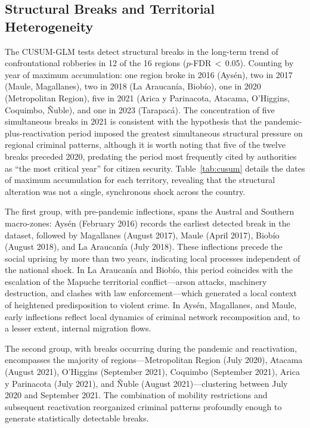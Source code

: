 \documentclass[pdflatex,sn-basic]{sn-jnl}
\begin{document}
\subsection{Structural Breaks and Territorial Heterogeneity}
\label{sub:regional}

The CUSUM-GLM tests detect structural breaks in the long-term trend of confrontational robberies in 12 of the 16 regions ($p$-FDR\,$<$\,0.05). Counting by year of maximum accumulation: one region broke in 2016 (Ays\'en), two in 2017 (Maule, Magallanes), two in 2018 (La Araucan\'ia, Biob\'io), one in 2020 (Metropolitan Region), five in 2021 (Arica y Parinacota, Atacama, O'Higgins, Coquimbo, \~Nuble), and one in 2023 (Tarapac\'a). The concentration of five simultaneous breaks in 2021 is consistent with the hypothesis that the pandemic-plus-reactivation period imposed the greatest simultaneous structural pressure on regional criminal patterns, although it is worth noting that five of the twelve breaks preceded 2020, predating the period most frequently cited by authorities as ``the most critical year'' for citizen security. Table~\ref{tab:cusum} details the dates of maximum accumulation for each territory, revealing that the structural alteration was not a single, synchronous shock across the country. 

The first group, with pre-pandemic inflections, spans the Austral and Southern macro-zones: Ays\'en (February 2016) records the earliest detected break in the dataset, followed by Magallanes (August 2017), Maule (April 2017), Biob\'io (August 2018), and La Araucan\'ia (July 2018). These inflections precede the social uprising by more than two years, indicating local processes independent of the national shock. In La Araucan\'ia and Biob\'io, this period coincides with the escalation of the Mapuche territorial conflict---arson attacks, machinery destruction, and clashes with law enforcement---which generated a local context of heightened predisposition to violent crime. In Ays\'en, Magallanes, and Maule, early inflections reflect local dynamics of criminal network recomposition and, to a lesser extent, internal migration flows. 

The second group, with breaks occurring during the pandemic and reactivation, encompasses the majority of regions---Metropolitan Region (July 2020), Atacama (August 2021), O'Higgins (September 2021), Coquimbo (September 2021), Arica y Parinacota (July 2021), and \~Nuble (August 2021)---clustering between July 2020 and September 2021. The combination of mobility restrictions and subsequent reactivation reorganized criminal patterns profoundly enough to generate statistically detectable breaks. 
\end{document}
